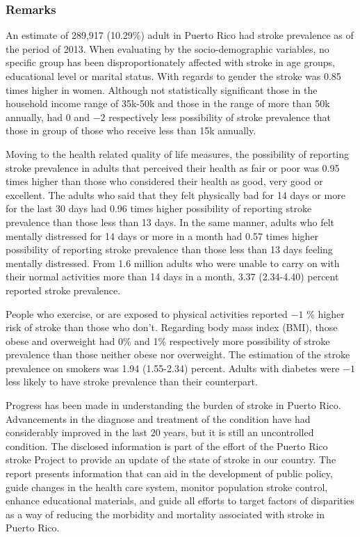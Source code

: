  \subsubsection{Remarks}

An estimate of 289,917 
(10.29\%) adult in Puerto Rico had stroke prevalence as of the period of 2013.
When evaluating by the socio-demographic variables, no specific group has been disproportionately affected with stroke in age groups, educational level or marital status. With regards to gender the stroke was 0.85 times higher in women. Although not statistically significant those in the household income range of 35k-50k and those in the range of more than 50k annually, had 0 and \ensuremath{-2} respectively less possibility of stroke prevalence that those  in group of those who receive less than 15k annually.

Moving to the health related quality of life measures, the possibility of reporting stroke prevalence in adults that perceived their health as fair or poor was 0.95 times higher than those who considered their health as good, very good or excellent. The adults who said that they felt physically bad for 14 days or more for the last 30 days had 0.96 times higher possibility of reporting stroke prevalence than those less than 13 days. In the same manner, adults who felt mentally distressed for 14 days or more in a month had 0.57 times higher possibility of reporting stroke prevalence than those less than 13 days feeling mentally distressed. From 1.6 million adults who were unable to carry on with their normal activities more than 14 days in a month, 3.37 (2.34-4.40) percent reported stroke prevalence. 

People who exercise, or are exposed to physical activities reported \ensuremath{-1} \% higher risk of stroke than those who don't.  Regarding body mass index (BMI), those obese and overweight had 0\% and 1\% respectively more possibility of stroke prevalence than those neither obese nor overweight. The estimation of the stroke prevalence on smokers was 1.94 (1.55-2.34) percent.  Adults with diabetes were \ensuremath{-1}\5 less likely to have stroke prevalence than their counterpart.



Progress has been made in understanding the burden of stroke in Puerto Rico. Advancements in the diagnose and treatment of the condition have had considerably improved in the last 20 years, but it is still an uncontrolled condition. The disclosed information is part of the effort of the Puerto Rico stroke Project to provide an update of the state of stroke in our country. The report presents information that can aid in the development of public policy, guide changes in the health care system, monitor population stroke control, enhance educational materials, and guide all efforts to target factors of disparities as a way of reducing the morbidity and mortality associated with stroke in Puerto Rico.

